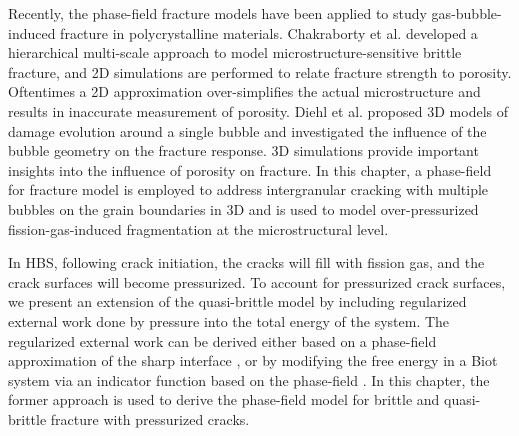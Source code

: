 Recently, the phase-field fracture models have been applied to study gas-bubble-induced fracture in polycrystalline materials. Chakraborty et al. \cite{pritam_2016} developed a hierarchical multi-scale approach to model microstructure-sensitive brittle fracture, and 2D simulations are performed to relate fracture strength to porosity. Oftentimes a 2D approximation over-simplifies the actual microstructure and results in inaccurate measurement of porosity. Diehl et al. \cite{Diehl2017} proposed 3D models of damage evolution around a single bubble and investigated the influence of the bubble geometry on the fracture response. 3D simulations provide important insights into the influence of porosity on fracture. In this chapter, a phase-field for fracture model is employed to address intergranular cracking with multiple bubbles on the grain boundaries in 3D and is used to model over-pressurized fission-gas-induced fragmentation at the microstructural level.

In HBS, following crack initiation, the cracks will fill with fission gas, and the crack surfaces will become pressurized. To account for pressurized crack surfaces, we present an extension of the quasi-brittle model by including regularized external work done by pressure into the total energy of the system. The regularized external work can be derived either based on a phase-field approximation of the sharp interface \cite{CHUKWUDOZIE2019957}, or by modifying the free energy in a Biot system via an indicator function based on the phase-field \cite{Mikeli__2015}. In this chapter, the former approach is used to derive the phase-field model for brittle and quasi-brittle fracture with pressurized cracks.
